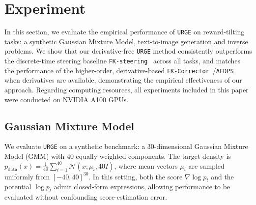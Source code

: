 \documentclass{article}
\theoremstyle{plain}
\theoremstyle{definition}
\theoremstyle{remark}
\newcommand{\yplu}[1]{{\color{orange}{ [\textbf{Yiping:}} #1]}}
\begin{document}
\section{Experiment}
\label{sec:Experiment}

In this section, we evaluate the empirical performance of \texttt{URGE} on reward-tilting tasks: a synthetic Gaussian Mixture Model, text-to-image generation and inverse problems. We show that our derivative-free \texttt{URGE} method consistently outperforms the discrete-time steering baseline \texttt{FK-steering}~\cite{singhal2025general} across all tasks, and matches the performance of the higher-order, derivative-based \texttt{FK-Corrector}~\cite{skreta2025feynman}/\texttt{AFDPS}~\cite{chen2025solving} when derivatives are available, demonstrating the empirical effectiveness of our approach. Regarding computing resources, all experiments included in this paper were conducted on NVIDIA A100 GPUs.




\subsection{Gaussian Mixture Model}


We evaluate \texttt{URGE} on a synthetic benchmark: a 30-dimensional Gaussian Mixture Model (GMM) with 40 equally weighted components. The target density is $p_{\text{data}}(x) = \frac{1}{40}\sum_{i=1}^{40}\mathcal{N}(x;\mu_{i},40I)$, where mean vectors $\mu_{i}$ are sampled uniformly from $[-40,40]^{30}$. In this setting, both the score \(\nabla \log p_t\) and the potential \(\log p_t\) admit closed-form expressions, allowing performance to be evaluated without confounding score-estimation error. 
\end{document}
